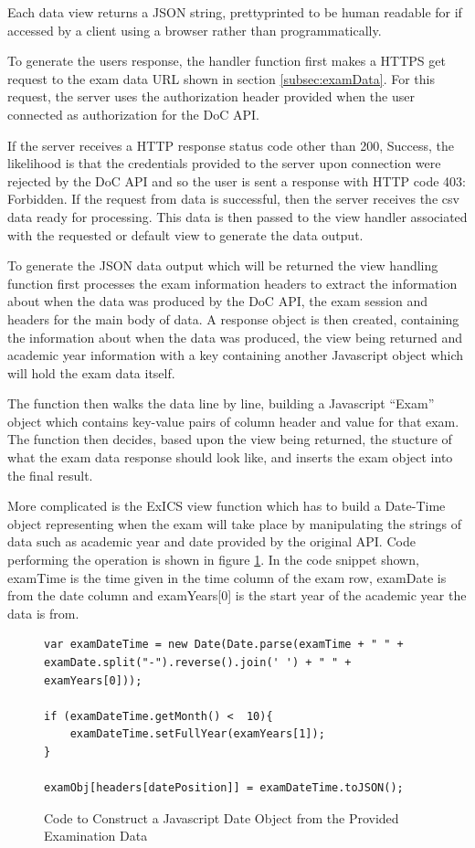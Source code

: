 Each data view returns a JSON string, prettyprinted to be human readable for if accessed by a client using a browser rather than programmatically.

To generate the users response, the handler function first makes a HTTPS get request to the exam data URL shown in section \ref{subsec:examData}.  For this request, the server uses the authorization header provided when the user connected as authorization for the DoC API.

If the server receives a HTTP response status code other than 200, Success, the likelihood is that the credentials provided to the server upon connection were rejected by the DoC API and so the user is sent a response with HTTP code 403: Forbidden.  If the request from data is successful, then the server receives the csv data ready for processing.  This data is then passed to the view handler associated with the requested or default view to generate the data output.

To generate the JSON data output which will be returned the view handling function first processes the exam information headers to extract the information about when the data was produced by the DoC API, the exam session and headers for the main body of data.  A response object is then created, containing the information about when the data was produced, the view being returned and academic year information with a key containing another Javascript object which will hold the exam data itself.

The function then walks the data line by line, building a Javascript ``Exam'' object which contains key-value pairs of column header and value for that exam.  The function then decides, based upon the view being returned, the stucture of what the exam data response should look like, and inserts the exam object into the final result.

More complicated is the ExICS view function which has to build a Date-Time object representing when the exam will take place by manipulating the strings of data such as academic year and date provided by the original API.  Code performing the operation is shown in figure \ref{fig:buildingDate}.  In the code snippet shown, examTime is the time given in the time column of the exam row, examDate is from the date column and examYears[0] is the start year of the academic year the data is from.

\begin{figure}[!htbp]
\centering
\lstset{language=JavaScript}
\begin{lstlisting}[tabsize=2,breaklines=true]
var examDateTime = new Date(Date.parse(examTime + " " + examDate.split("-").reverse().join(' ') + " " + examYears[0]));

if (examDateTime.getMonth() <  10){
	examDateTime.setFullYear(examYears[1]);
}

examObj[headers[datePosition]] = examDateTime.toJSON();
\end{lstlisting}
\caption{Code to Construct a Javascript Date Object from the Provided Examination Data}
\label{fig:buildingDate}
\end{figure}

